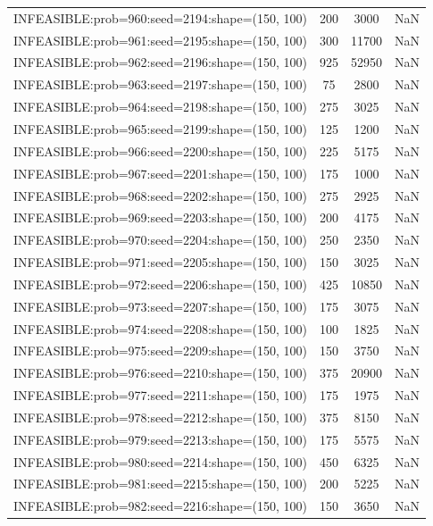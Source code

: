 \begin{longtable}{lccc}
INFEASIBLE:prob=960:seed=2194:shape=(150, 100) &      200 &  3000 &    NaN \\
INFEASIBLE:prob=961:seed=2195:shape=(150, 100) &      300 & 11700 &    NaN \\
INFEASIBLE:prob=962:seed=2196:shape=(150, 100) &      925 & 52950 &    NaN \\
INFEASIBLE:prob=963:seed=2197:shape=(150, 100) &       75 &  2800 &    NaN \\
INFEASIBLE:prob=964:seed=2198:shape=(150, 100) &      275 &  3025 &    NaN \\
INFEASIBLE:prob=965:seed=2199:shape=(150, 100) &      125 &  1200 &    NaN \\
INFEASIBLE:prob=966:seed=2200:shape=(150, 100) &      225 &  5175 &    NaN \\
INFEASIBLE:prob=967:seed=2201:shape=(150, 100) &      175 &  1000 &    NaN \\
INFEASIBLE:prob=968:seed=2202:shape=(150, 100) &      275 &  2925 &    NaN \\
INFEASIBLE:prob=969:seed=2203:shape=(150, 100) &      200 &  4175 &    NaN \\
INFEASIBLE:prob=970:seed=2204:shape=(150, 100) &      250 &  2350 &    NaN \\
INFEASIBLE:prob=971:seed=2205:shape=(150, 100) &      150 &  3025 &    NaN \\
INFEASIBLE:prob=972:seed=2206:shape=(150, 100) &      425 & 10850 &    NaN \\
INFEASIBLE:prob=973:seed=2207:shape=(150, 100) &      175 &  3075 &    NaN \\
INFEASIBLE:prob=974:seed=2208:shape=(150, 100) &      100 &  1825 &    NaN \\
INFEASIBLE:prob=975:seed=2209:shape=(150, 100) &      150 &  3750 &    NaN \\
INFEASIBLE:prob=976:seed=2210:shape=(150, 100) &      375 & 20900 &    NaN \\
INFEASIBLE:prob=977:seed=2211:shape=(150, 100) &      175 &  1975 &    NaN \\
INFEASIBLE:prob=978:seed=2212:shape=(150, 100) &      375 &  8150 &    NaN \\
INFEASIBLE:prob=979:seed=2213:shape=(150, 100) &      175 &  5575 &    NaN \\
INFEASIBLE:prob=980:seed=2214:shape=(150, 100) &      450 &  6325 &    NaN \\
INFEASIBLE:prob=981:seed=2215:shape=(150, 100) &      200 &  5225 &    NaN \\
INFEASIBLE:prob=982:seed=2216:shape=(150, 100) &      150 &  3650 &    NaN \\

\end{longtable}
